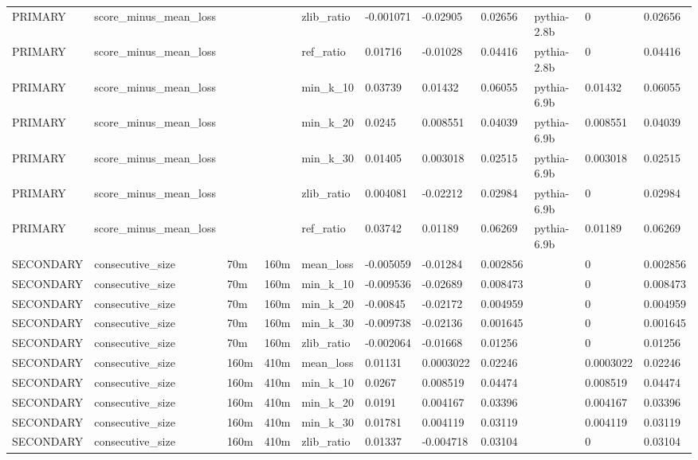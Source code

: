 \begin{tabular}{lllllllllll}
PRIMARY & score\_minus\_mean\_loss &  &  & zlib\_ratio & -0.001071 & -0.02905 & 0.02656 & pythia-2.8b & 0 & 0.02656 \\
PRIMARY & score\_minus\_mean\_loss &  &  & ref\_ratio & 0.01716 & -0.01028 & 0.04416 & pythia-2.8b & 0 & 0.04416 \\
PRIMARY & score\_minus\_mean\_loss &  &  & min\_k\_10 & 0.03739 & 0.01432 & 0.06055 & pythia-6.9b & 0.01432 & 0.06055 \\
PRIMARY & score\_minus\_mean\_loss &  &  & min\_k\_20 & 0.0245 & 0.008551 & 0.04039 & pythia-6.9b & 0.008551 & 0.04039 \\
PRIMARY & score\_minus\_mean\_loss &  &  & min\_k\_30 & 0.01405 & 0.003018 & 0.02515 & pythia-6.9b & 0.003018 & 0.02515 \\
PRIMARY & score\_minus\_mean\_loss &  &  & zlib\_ratio & 0.004081 & -0.02212 & 0.02984 & pythia-6.9b & 0 & 0.02984 \\
PRIMARY & score\_minus\_mean\_loss &  &  & ref\_ratio & 0.03742 & 0.01189 & 0.06269 & pythia-6.9b & 0.01189 & 0.06269 \\
SECONDARY & consecutive\_size & 70m & 160m & mean\_loss & -0.005059 & -0.01284 & 0.002856 &  & 0 & 0.002856 \\
SECONDARY & consecutive\_size & 70m & 160m & min\_k\_10 & -0.009536 & -0.02689 & 0.008473 &  & 0 & 0.008473 \\
SECONDARY & consecutive\_size & 70m & 160m & min\_k\_20 & -0.00845 & -0.02172 & 0.004959 &  & 0 & 0.004959 \\
SECONDARY & consecutive\_size & 70m & 160m & min\_k\_30 & -0.009738 & -0.02136 & 0.001645 &  & 0 & 0.001645 \\
SECONDARY & consecutive\_size & 70m & 160m & zlib\_ratio & -0.002064 & -0.01668 & 0.01256 &  & 0 & 0.01256 \\
SECONDARY & consecutive\_size & 160m & 410m & mean\_loss & 0.01131 & 0.0003022 & 0.02246 &  & 0.0003022 & 0.02246 \\
SECONDARY & consecutive\_size & 160m & 410m & min\_k\_10 & 0.0267 & 0.008519 & 0.04474 &  & 0.008519 & 0.04474 \\
SECONDARY & consecutive\_size & 160m & 410m & min\_k\_20 & 0.0191 & 0.004167 & 0.03396 &  & 0.004167 & 0.03396 \\
SECONDARY & consecutive\_size & 160m & 410m & min\_k\_30 & 0.01781 & 0.004119 & 0.03119 &  & 0.004119 & 0.03119 \\
SECONDARY & consecutive\_size & 160m & 410m & zlib\_ratio & 0.01337 & -0.004718 & 0.03104 &  & 0 & 0.03104 \\

\end{tabular}

